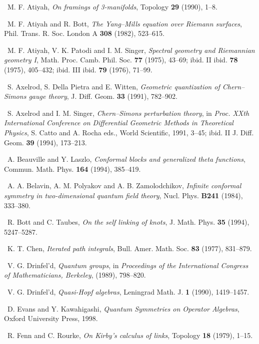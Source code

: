 \noindent [14]\ M. F. Atiyah, \textit{On framings of 3-manifolds}, Topology \textbf{29} (1990), 1--8.

\noindent [15]\ M. F. Atiyah and R. Bott, \textit{The Yang--Mills equation over Riemann surfaces}, Phil. Trans. R. Soc. London A \textbf{308} (1982), 523--615.

\noindent [16]\ M. F. Atiyah, V. K. Patodi and I. M. Singer, \textit{Spectral geometry and Riemannian geometry I}, Math. Proc. Camb. Phil. Soc. \textbf{77} (1975), 43--69; ibid. II ibid. \textbf{78} (1975), 405--432; ibid. III ibid. \textbf{79} (1976), 71--99.

\noindent [17]\ S. Axelrod, S. Della Pietra and E. Witten, \textit{Geometric quantization of Chern--Simons gauge theory}, J. Diff. Geom. \textbf{33} (1991), 782--902.

\noindent [18]\ S. Axelrod and I. M. Singer, \textit{Chern--Simons perturbation theory}, in \textit{Proc. XXth International Conference on Differential Geometric Methods in Theoretical Physics}, S. Catto and A. Rocha eds., World Scientific, 1991, 3--45; ibid. II J. Diff. Geom. \textbf{39} (1994), 173--213.

\noindent [19]\ A. Beauville and Y. Laszlo, \textit{Conformal blocks and generalized theta functions}, Commun. Math. Phys. \textbf{164} (1994), 385--419.

\noindent [20]\ A. A. Belavin, A. M. Polyakov and A. B. Zamolodchikov, \textit{Infinite conformal symmetry in two-dimensional quantum field theory}, Nucl. Phys. \textbf{B241} (1984), 333--380.

\noindent [21]\ R. Bott and C. Taubes, \textit{On the self linking of knots}, J. Math. Phys. \textbf{35} (1994), 5247--5287.

\noindent [22]\ K. T. Chen, \textit{Iterated path integrals}, Bull. Amer. Math. Soc. \textbf{83} (1977), 831--879.

\noindent [23]\ V. G. Drinfel'd, \textit{Quantum groups}, in \textit{Proceedings of the International Congress of Mathematicians, Berkeley}, (1989), 798--820.

\noindent [24]\ V. G. Drinfel'd, \textit{Quasi-Hopf algebras}, Leningrad Math. J. \textbf{1} (1990), 1419--1457.

\noindent [25]\ D. Evans and Y. Kawahigashi, \textit{Quantum Symmetries on Operator Algebras}, Oxford University Press, 1998.

\noindent [26]\ R. Fenn and C. Rourke, \textit{On Kirby's calculus of links}, Topology \textbf{18} (1979), 1--15.

